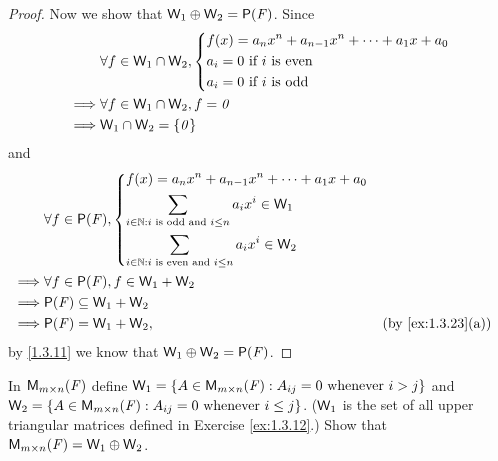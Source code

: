 \begin{proof}
  Now we show that \(\W_1 \oplus \W_2 = \ps{\F}\).
  Since
  \begin{align*}
             & \forall f \in \mathsf{W}_1 \cap \mathsf{W}_2, \begin{dcases}
      f(x) = a_n x^n + a_{n - 1} x^n + \cdots + a_1 x + a_0 \\
      a_i = 0 \text{ if } i \text{ is even}                 \\
      a_i = 0 \text{ if } i \text{ is odd}
    \end{dcases} \\
    \implies & \forall f \in \mathsf{W}_1 \cap \mathsf{W}_2, f = \mathit{0}                    \\
    \implies & \mathsf{W}_1 \cap \mathsf{W}_2 = \left\lbrace\mathit{0}\right\rbrace
  \end{align*}
  and
  \begin{align*}
             & \forall f \in \ps{\F}, \begin{dcases}
      f(x) = a_n x^n + a_{n - 1} x^n + \cdots + a_1 x + a_0             \\
      \sum_{i \in \N : i \text{ is odd and } i \leq n} a_i x^i \in \W_1 \\
      \sum_{i \in \N : i \text{ is even and } i \leq n} a_i x^i \in \W_2
    \end{dcases}                                      \\
    \implies & \forall f \in \ps{\F}, f \in \W_1 + \W_2                                               \\
    \implies & \ps{\F} \subseteq \W_1 + \W_2                                                          \\
    \implies & \ps{\F} = \W_1 + \W_2,                            &  & \text{(by \cref{ex:1.3.23}(a))}
  \end{align*}
  by \cref{1.3.11} we know that \(\W_1 \oplus \W_2 = \ps{\F}\).
\end{proof}

\begin{ex}\label{ex:1.3.26}
  In \(\mathsf{M}_{{m} \times n}({\mathit{F}})\) define \(\mathsf{W}_1 = \left\lbrace A \in \mathsf{M}_{{m} \times n}({\mathit{F}}) : A_{i j} = 0 \text{ whenever } i > j\right\rbrace\) and \(\mathsf{W}_2 = \left\lbrace A \in \mathsf{M}_{{m} \times n}({\mathit{F}}) : A_{i j} = 0 \text{ whenever } i \leq j\right\rbrace\).
  (\(\mathsf{W}_1\) is the set of all upper triangular matrices defined in Exercise \cref{ex:1.3.12}.)
  Show that \(\mathsf{M}_{{m} \times n}({\mathit{F}}) = \mathsf{W}_1 \oplus \mathsf{W}_2\).
\end{ex}

